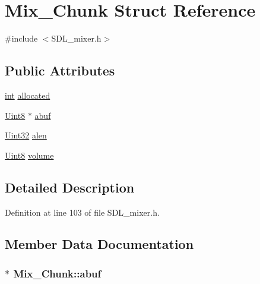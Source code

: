 \hypertarget{struct_mix___chunk}{\section{Mix\-\_\-\-Chunk Struct Reference}
\label{struct_mix___chunk}
}


{\ttfamily \#include $<$S\-D\-L\-\_\-mixer.\-h$>$}

\subsection*{Public Attributes}
\begin{DoxyCompactItemize}
\item 
\hyperlink{_s_d_l__thread_8h_a6a64f9be4433e4de6e2f2f548cf3c08e}{int} \hyperlink{struct_mix___chunk_a7b985b90b5f97fffe34834116a281615}{allocated}
\item 
\hyperlink{_s_d_l__stdinc_8h_a2944638813a090aa23e62f4da842c3e2}{Uint8} $\ast$ \hyperlink{struct_mix___chunk_a30b3b1a72677d076a1caa72422bb3774}{abuf}
\item 
\hyperlink{_s_d_l__stdinc_8h_add440eff171ea5f55cb00c4a9ab8672d}{Uint32} \hyperlink{struct_mix___chunk_a958507964471fc4b9fa0d215f1852d05}{alen}
\item 
\hyperlink{_s_d_l__stdinc_8h_a2944638813a090aa23e62f4da842c3e2}{Uint8} \hyperlink{struct_mix___chunk_afc566fd5da7f0ed1f3577f5bc0eac319}{volume}
\end{DoxyCompactItemize}


\subsection{Detailed Description}


Definition at line 103 of file S\-D\-L\-\_\-mixer.\-h.



\subsection{Member Data Documentation}
\hypertarget{struct_mix___chunk_a30b3b1a72677d076a1caa72422bb3774}{
\subsubsection[{abuf}]{$\ast$ Mix\-\_\-\-Chunk\-::abuf}}\label{struct_mix___chunk_a30b3b1a72677d076a1caa72422bb3774}


